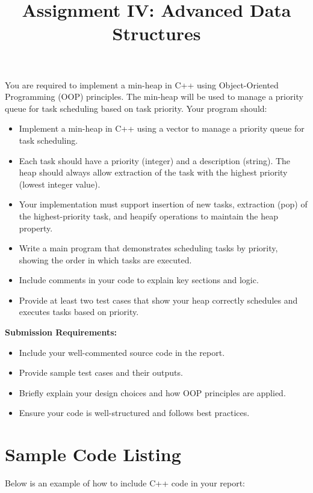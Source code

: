 \documentclass{../LatexStyle/style}
\title{\Large \bf Assignment IV: Advanced Data Structures}
\begin{document}
\maketitle

\begin{instructions}
You are required to implement a min-heap in C++ using Object-Oriented Programming (OOP) principles. The min-heap will be used to manage a priority queue for task scheduling based on task priority.
Your program should:
    \begin{itemize}
    \item Implement a min-heap in C++ using a vector to manage a priority queue for task scheduling.
    \item Each task should have a priority (integer) and a description (string). The heap should always allow extraction of the task with the highest priority (lowest integer value).
    \item Your implementation must support insertion of new tasks, extraction (pop) of the highest-priority task, and heapify operations to maintain the heap property.
    \item Write a main program that demonstrates scheduling tasks by priority, showing the order in which tasks are executed.
    \item Include comments in your code to explain key sections and logic.
    \item Provide at least two test cases that show your heap correctly schedules and executes tasks based on priority.
\end{itemize}
    \textbf{Submission Requirements:}
    \begin{itemize}
        \item Include your well-commented source code in the report.
        \item Provide sample test cases and their outputs.
        \item Briefly explain your design choices and how OOP principles are applied.
        \item Ensure your code is well-structured and follows best practices.
    \end{itemize}
\end{instructions}





\section{Sample Code Listing}
Below is an example of how to include C++ code in your report:
\end{document}
